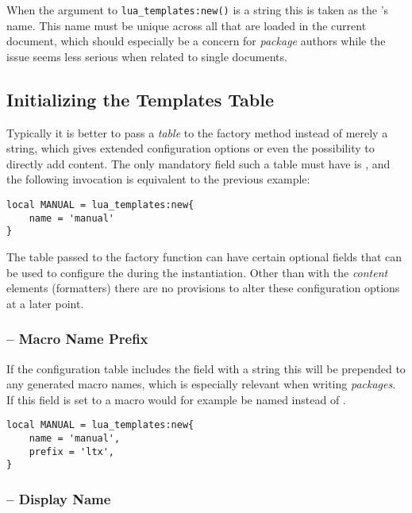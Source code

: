 \documentclass[12pt]{scrartcl}
\begin{document}
\noindent When the argument to \texttt{lua_templates:new()} is a string
this is taken as the 's name.  This name must be unique
across all  that are loaded in the current document, which
should especially be a concern for \emph{package} authors while the issue seems
less serious when related to single documents.


\subsection{Initializing the Templates Table}
\label{sec:usage-initializing-the-template-table}

Typically it is better to pass a \emph{table} to the factory method instead of
merely a string, which gives extended configuration options or even the
possibility to directly add content. The only mandatory field such a table must
have is , and the following invocation is equivalent to the
previous example:

\begin{verbatim}
local MANUAL = lua_templates:new{
	name = 'manual'
}
\end{verbatim}

\noindent The table passed to the factory function can have certain optional
fields that can be used to configure the  during the
instantiation. Other than with the \emph{content} elements (formatters) there
are no provisions to alter these configuration options at a later point.

\subsubsection[Macro Name Prefix]{ -- Macro Name Prefix}

If the configuration table includes the  field with a string this
will be prepended to any generated macro names, which is especially relevant
when writing \emph{packages}.  If this field is set to  a macro
would for example be named  instead of .

\begin{verbatim}
local MANUAL = lua_templates:new{
	name = 'manual',
	prefix = 'ltx',
}
\end{verbatim}


\subsubsection[Display Name]{ -- Display Name}
\end{document}
